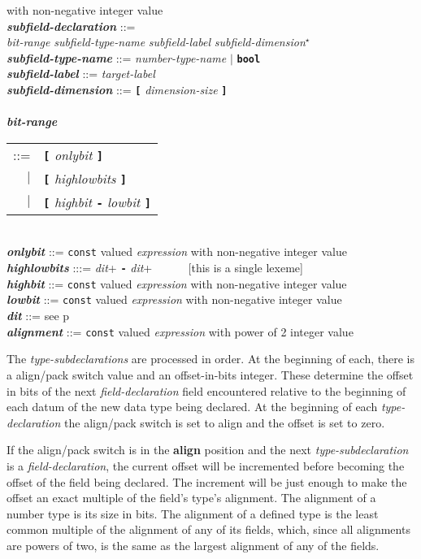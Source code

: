 \documentclass[12pt]{article}
\newcommand{\TT}[1]{{\tt \bfseries #1}}
\newcommand{\STAR}{{\Large $^\star$}}
\newcommand{\key}[1]{{\rm \bfseries #1}}
\newcommand{\emkey}[1]{{\em \bfseries #1}}
\newcommand{\pagref}[1]{p\pageref{#1}}
\newenvironment{indpar}[1][0.3in]%
	{\begin{list}{}%
		     {\setlength{\itemsep}{0in}%
		      \setlength{\topsep}{0in}%
		      \setlength{\parsep}{1ex}%
		      \setlength{\labelwidth}{#1}%
		      \setlength{\leftmargin}{#1}%
		      \addtolength{\leftmargin}{\labelsep}}%
	 \item}%
	{\end{list}}
\begin{document}
\begin{indpar}
			    with non-negative integer value
\\[2ex]
\emkey{subfield-declaration} ::= \\
\hspace*{0.5in}
    {\em bit-range} {\em subfield-type-name} {\em subfield-label}
    		{\em subfield-dimension}\STAR{} \\
\emkey{subfield-type-name}\label{SUBFIELD-TYPE-NAME} ::=
    {\em number-type-name} $|$ \TT{bool} \\
\emkey{subfield-label}\label{SUBFIELD-LABEL} ::=  {\em target-label} \\
\emkey{subfield-dimension} ::=  \TT{[} {\em dimension-size} \TT{]} \\
\\[2ex]
\emkey{bit-range}
    \begin{tabular}[t]{@{}rl}
    ::= &  \TT{[} {\em onlybit} \TT{]} \\
    $|$ &  \TT{[} {\em highlowbits} \TT{]} \\
    $|$ &  \TT{[} {\em highbit} \TT{-} {\em lowbit} \TT{]}
    \end{tabular} \\
\emkey{onlybit} ::= {\tt const} valued {\em expression}
		    with non-negative integer value \\
\emkey{highlowbits} :::= {\em dit}+ \TT{-} {\em dit}+
           ~~~~~ [this is a single lexeme] \\
\emkey{highbit} ::= {\tt const} valued {\em expression}
		    with non-negative integer value \\
\emkey{lowbit} ::= {\tt const} valued {\em expression}
		   with non-negative integer value \\
\emkey{dit} ::= see \pagref{DIT}
\\[2ex]
\emkey{alignment} ::= {\tt const} valued {\em expression}
		      with power of 2 integer value
\end{indpar}

The {\em type-subdeclarations} are processed in order.  At the
beginning of each, there is a align/pack switch value and an
offset-in-bits integer.  These determine the offset in bits
of the next {\em field-declaration} field encountered
relative to the beginning of each datum of the new data
type being declared.  At the beginning of each {\em type-declaration}
the align/pack switch is set to align and the offset is set to zero.

If the align/pack switch is in the \key{align} position and the
next {\em type-subdeclaration} is a {\em field-declaration}, the
current offset will be incremented before becoming the offset
of the field being declared.  The increment will be just enough
to make the offset an exact multiple of the field's type's alignment.
The alignment of a number type is its size in bits.  The alignment
of a defined type is the least common multiple of the alignment of
any of its fields, which, since all alignments are powers of two,
is the same as the largest alignment of any of the fields.
\end{document}
